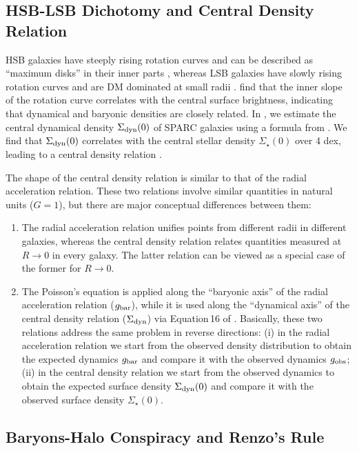 \documentclass[apjl, twocolappendix]{emulateapj}
\begin{document}
\subsection{HSB-LSB Dichotomy and Central Density Relation}

HSB galaxies have steeply rising rotation curves and can be described as ``maximum disks'' in their inner parts \citep[e.g.,][]{vanAlbada1986}, whereas LSB galaxies have slowly rising rotation curves and are DM dominated at small radii \citep[e.g.,][]{deBlok1997}. \citet{Lelli2013} find that the inner slope of the rotation curve correlates with the central surface brightness, indicating that dynamical and baryonic densities are closely related. In \citet{Lelli2016c}, we estimate the central dynamical density $\Sigma_{\rm dyn}(0)$ of SPARC galaxies using a formula from \citet{Toomre1963}. We find that $\Sigma_{\rm dyn}(0)$ correlates with the central stellar density $\Sigma_{\star}(0)$ over 4 dex, leading to a central density relation \citep[see also][]{Swaters2014}.

The shape of the central density relation is similar to that of the radial acceleration relation. These two relations involve similar quantities in natural units ($G=1$), but there are major conceptual differences between them:
\begin{enumerate}
 \item The radial acceleration relation unifies points from different radii in different galaxies, whereas the central density relation relates quantities measured at $R\rightarrow0$ in every galaxy. The latter relation can be viewed as a special case of the former for $R\rightarrow0$.
 \item The Poisson's equation is applied along the ``baryonic axis'' of the radial acceleration relation ($g_{\rm bar}$), while it is used along the ``dynamical axis'' of the central density relation ($\Sigma_{\rm dyn}$) via Equation\,16 of \citet{Toomre1963}. Basically, these two relations address the same problem in reverse directions: (i) in the radial acceleration relation we start from the observed density distribution to obtain the expected dynamics $g_{\rm bar}$ and compare it with the observed dynamics $g_{\rm obs}$; (ii) in the central density relation we start from the observed dynamics to obtain the expected surface density $\Sigma_{\rm dyn}(0)$ and compare it with the observed surface density $\Sigma_{\star}(0)$.
\end{enumerate}

\subsection{Baryons-Halo Conspiracy and Renzo's Rule}
\end{document}
